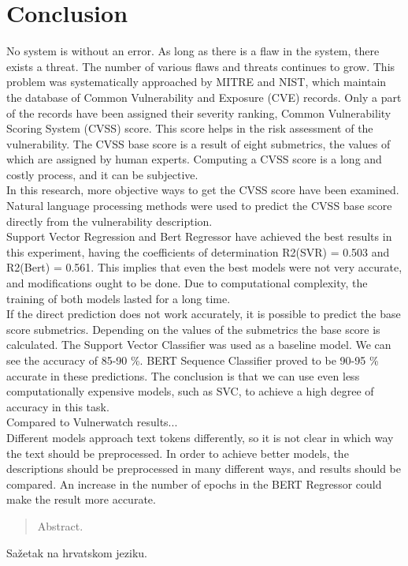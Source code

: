 \documentclass[times, utf8, zavrsni, english]{fer}
\begin{document}
\chapter{Conclusion}
No system is without an error. As long as there is a flaw in the system, there exists a threat. The number of various flaws and threats continues to grow. This problem was systematically approached by MITRE and NIST, which maintain the database of Common Vulnerability and Exposure (CVE) records. Only a part of the records have been assigned their severity ranking, Common Vulnerability Scoring System (CVSS) score. This score helps in the risk assessment of the vulnerability. The CVSS base score is a result of eight submetrics, the values of which are assigned by human experts. Computing a CVSS score is a long and costly process, and it can be subjective. \\

In this research, more objective ways to get the CVSS score have been examined. Natural language processing methods were used to predict the CVSS base score directly from the vulnerability description.\\
Support Vector Regression and Bert Regressor have achieved the best results in this experiment, having the coefficients of determination R2(SVR) = 0.503 and R2(Bert) = 0.561. This implies that even the best models were not very accurate, and modifications ought to be done. Due to computational complexity, the training of both models lasted for a long time. \\
If the direct prediction does not work accurately, it is possible to predict the base score submetrics. Depending on the values of the submetrics the base score is calculated. The Support Vector Classifier was used as a baseline model. We can see the accuracy of 85-90 \%. BERT Sequence Classifier proved to be 90-95 \% accurate in these predictions. The conclusion is that we can use even less computationally expensive models, such as SVC, to achieve a high degree of accuracy in this task.\\
Compared to Vulnerwatch results...\\

Different models approach text tokens differently, so it is not clear in which way the text should be preprocessed. 
In order to achieve better models, the descriptions should be preprocessed in many different ways, and results should be compared.
An increase in the number of epochs in the BERT Regressor could make the result more accurate. 





\listoffigures
\begin{abstract}
Abstract.

\end{abstract}

\begin{sazetak}
Sažetak na hrvatskom jeziku.

\end{sazetak}
\end{document}
